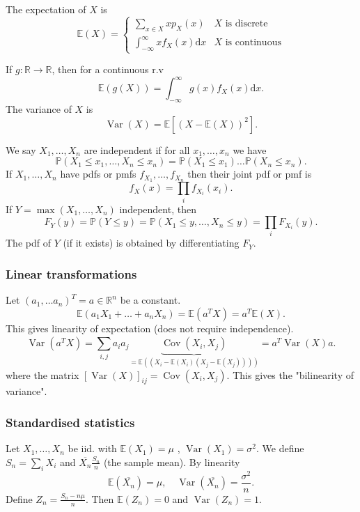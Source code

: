 \documentclass[a4paper]{scrartcl}
\begin{document}
\begin{definition*}
     The expectation of $X$ is 
     \begin{equation*}
          \mathbb{E} (X)=
          \begin{cases}
              \sum_{x \in X}^{}x p_X (x) & X \text{ is discrete} \\
              \int_{-\infty }^{\infty} x f_X (x)\mathrm{d}x & X \text{ is continuous}
          \end{cases}
     \end{equation*}
     
     If $g: \mathbb{R} \to \mathbb{R} $, then for a continuous r.v \[
     \mathbb{E} (g (X))=\int_{-\infty }^{\infty} g (x) f_X (x)\mathrm{d}x
     .\] 
     The variance of $X$ is \[
          \operatorname{Var} (X)= \mathbb{E} [(X-\mathbb{E}(X))^2]
     .\] 
\end{definition*}
\begin{definition*}[Independence]
     We say $X_1 , \ldots ,X_n$ are independent if for all $x_1 , \ldots , x_n$ we have \[
     \mathbb{P} (X_1 \leq x_1 , \ldots ,X_n \leq x_n )=\mathbb{P}(X_1 \leq x_1) \ldots \mathbb{P}(X_n \leq x_n)
     .\] 
     If $X_1 , \ldots ,X_n $ have pdfs or pmfs $f_{X_1 }, \ldots,f_{X_n } $ then their joint pdf or pmf is \[
     f_X (x)=\prod_{i}f_{X_i}(x_i)
     .\] 
     If $Y=\max (X_1 , \ldots ,X_n)$ independent, then \[
     F_Y (y)=\mathbb{P} (Y \leq y)=\mathbb{P} (X_1 \leq y , \ldots ,X_n \leq y )=\prod_{i}F_{X_i}(y)
     .\] The pdf of $Y$ (if it exists) is obtained by differentiating $F_Y$.
\end{definition*}
\subsubsection*{Linear transformations}
Let $(a_1 , \ldots a_n)^T=a \in \mathbb{R}^{n}$ be a constant. \[
\mathbb{E} (a_1 X_1 +\ldots +a_n X_n)=\mathbb{E}(a^{T}X)=a^{T}\mathbb{E}(X)
.\]
This gives linearity of expectation (does not require independence). 
\[
\operatorname{Var}(a^{T}X)=\sum_{i,j}^{}a_{i}a_{j}\underbrace{\operatorname{Cov}(X_{i}, X_{j})}_{=\mathbb{E}((X_{i}-\mathbb{E}(X_{i})(X_{j}-\mathbb{E}(X_{j}))))} =a^{T}\operatorname{Var}(X)a
.\] 
where the matrix $[\operatorname{Var}(X)]_{ij}=\operatorname{Cov}(X_{i},X_{j})$. This gives the "bilinearity of variance".
\subsubsection*{Standardised statistics}
Let $X_1 , \ldots , X_n$ be iid. with $\mathbb{E}(X_1 )=\mu$ , $\operatorname{Var}(X_1)=\sigma^2$. We define $S_n=\sum_{i}^{}X_{i}$ and $\overline{X_n} \frac{S_n}{n} $ (the sample mean). By linearity \[
\mathbb{E} (\overline{X_n} )=\mu, \quad \operatorname{Var }(\overline{X_n} )= \frac{\sigma^2}{n}
.\]   
Define $Z_{n}= \frac{S_{n}-n \mu}{n}$. Then $\mathbb{E}(Z_{n})=0$ and $\operatorname{Var}(Z_{n})=1$. 
\end{document}
